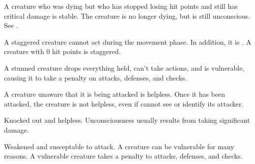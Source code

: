  A creature who was dying but who has stopped losing hit points and still has critical damage is stable. The creature is no longer dying, but is still unconscious. See .

 A staggered creature cannot act during the movement phase. In addition, it is \vulnerable. A creature with 0 hit points is staggered.

 A stunned creature drops everything held, can't take actions, and is vulnerable, causing it to take a  penalty on attacks, defenses, and checks.

 A creature unaware that it is being attacked is helpless. Once it has been attacked, the creature is not helpless, even if cannot see or identify its attacker.

 Knocked out and helpless. Unconsciousness usually results from taking significant damage. 

 Weakened and susceptable to attack. A creature can be vulnerable for many reasons. A vulnerable creature takes a  penalty to attacks, defenses, and checks.

